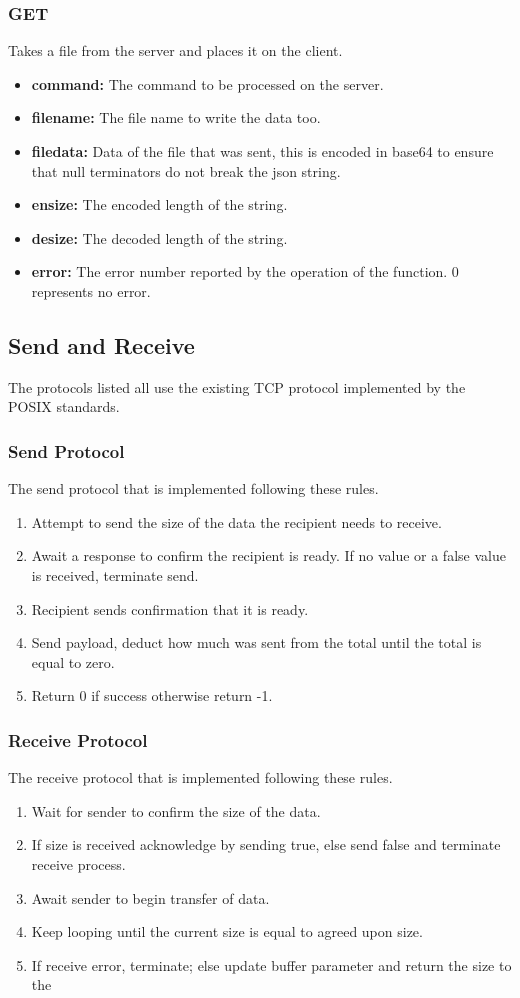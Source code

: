 \documentclass{article}
\begin{document}
\subsubsection{GET}
Takes a file from the server and places it on the client.
\begin{itemize}
\item \textbf{command:} The command to be processed on the server.
\item \textbf{filename:} The file name to write the data too.
\item \textbf{filedata:} Data of the file that was sent, this is encoded in base64 to ensure that null terminators do not break the json string.
\item \textbf{ensize:} The encoded length of the string.
\item \textbf{desize:} The decoded length of the string.
\item \textbf{error:} The error number reported by the operation of the function. 0 represents no error.
\end{itemize}
\subsection{Send and Receive}
The protocols listed all use the existing TCP protocol implemented by the POSIX standards.
\subsubsection{Send Protocol}
The send protocol that is implemented following these rules.
\begin{enumerate}
    \item Attempt to send the size of the data the recipient needs to receive.
    \item Await a response to confirm the recipient is ready. If no value or a false value is received, terminate send.
    \item Recipient sends confirmation that it is ready.
    \item Send payload, deduct how much was sent from the total until the total is equal to zero.
    \item Return 0 if success otherwise return -1.
\end{enumerate}
\subsubsection{Receive Protocol}
The receive protocol that is implemented following these rules.
\begin{enumerate}
    \item Wait for sender to confirm the size of the data.
    \item If size is received acknowledge by sending true, else send false and terminate receive process.
    \item Await sender to begin transfer of data.
    \item Keep looping until the current size is equal to agreed upon size.
    \item If receive error, terminate; else update buffer parameter and return the size to the
\end{enumerate}
\end{document}
